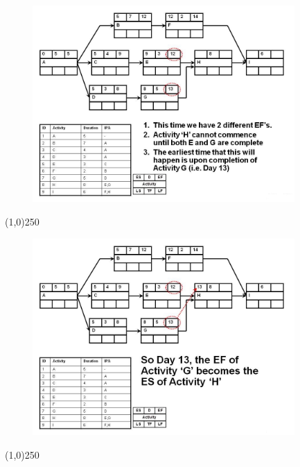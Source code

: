 \begin{frame}
\begin{figure}
	\centering
		\includegraphics[width = 10.0cm]{oldnotes/Slide146.jpg}
\end{figure}
\end{frame}
\begin{center}\line(1,0){250}\end{center}




\begin{frame}
\begin{figure}
	\centering
		\includegraphics[width = 10.0cm]{oldnotes/Slide147.jpg}
\end{figure}
\end{frame}
\begin{center}\line(1,0){250}\end{center}




